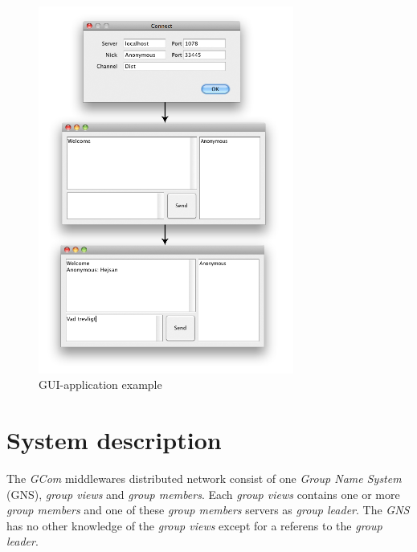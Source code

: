 \documentclass[titlepage, twocolumn, a4paper, 10pt]{article}
\begin{document}
\begin{figure}[!thb]
  \centering
  \includegraphics[width=3.3in]{images/TestProgram.png}
  \caption{GUI-application example }
  \label{fig:images/guiapp}
\end{figure}



\section{System description}\label{sec:system}


The \textit{GCom} middlewares distributed network consist of one
\textit{Group Name System} (GNS), \textit{group views} and
\textit{group members}. Each \textit{group views} contains
one or more \textit{group members} and one of these
\textit{group members} servers as \textit{group leader}.
The \textit{GNS} has no other knowledge of the \textit{group views}
except for a referens to the \textit{group leader}.
\end{document}
